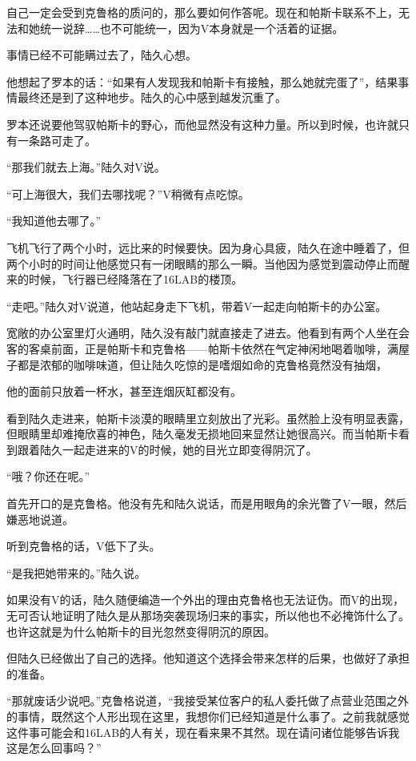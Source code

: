 自己一定会受到克鲁格的质问的，那么要如何作答呢。现在和帕斯卡联系不上，无法和她统一说辞……也不可能统一，因为V本身就是一个活着的证据。

事情已经不可能瞒过去了，陆久心想。

他想起了罗本的话：“如果有人发现我和帕斯卡有接触，那么她就完蛋了”，结果事情最终还是到了这种地步。陆久的心中感到越发沉重了。

罗本还说要他驾驭帕斯卡的野心，而他显然没有这种力量。所以到时候，也许就只有一条路可走了。

“那我们就去上海。”陆久对V说。

“可上海很大，我们去哪找呢？”V稍微有点吃惊。

“我知道他去哪了。”

飞机飞行了两个小时，远比来的时候要快。因为身心具疲，陆久在途中睡着了，但两个小时的时间让他感觉只有一闭眼睛的那么一瞬。当他因为感觉到震动停止而醒来的时候，飞行器已经降落在了16LAB的楼顶。

“走吧。”陆久对V说道，他站起身走下飞机，带着V一起走向帕斯卡的办公室。

宽敞的办公室里灯火通明，陆久没有敲门就直接走了进去。他看到有两个人坐在会客的客桌前面，正是帕斯卡和克鲁格——帕斯卡依然在气定神闲地喝着咖啡，满屋子都是浓郁的咖啡味道，但让陆久吃惊的是嗜烟如命的克鲁格竟然没有抽烟，

他的面前只放着一杯水，甚至连烟灰缸都没有。

看到陆久走进来，帕斯卡淡漠的眼睛里立刻放出了光彩。虽然脸上没有明显表露，但眼睛里却难掩欣喜的神色，陆久毫发无损地回来显然让她很高兴。而当帕斯卡看到跟着陆久一起走进来的V的时候，她的目光立即变得阴沉了。

“哦？你还在呢。”

首先开口的是克鲁格。他没有先和陆久说话，而是用眼角的余光瞥了V一眼，然后嫌恶地说道。

听到克鲁格的话，V低下了头。

“是我把她带来的。”陆久说。

如果没有V的话，陆久随便编造一个外出的理由克鲁格也无法证伪。而V的出现，无可否认地证明了陆久是从那场突袭现场归来的事实，所以他也不必掩饰什么了。也许这就是为什么帕斯卡的目光忽然变得阴沉的原因。

但陆久已经做出了自己的选择。他知道这个选择会带来怎样的后果，也做好了承担的准备。

“那就废话少说吧。”克鲁格说道，“我接受某位客户的私人委托做了点营业范围之外的事情，既然这个人形出现在这里，我想你们已经知道是什么事了。之前我就感觉这件事可能会和16LAB的人有关，现在看来果不其然。现在请问诸位能够告诉我这是怎么回事吗？”

